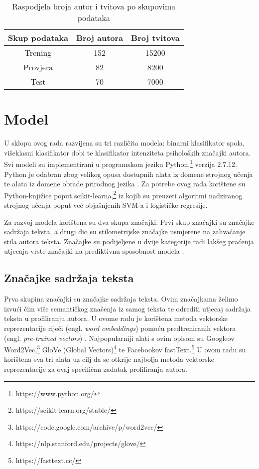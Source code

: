 \documentclass[times, utf8, zavrsni]{fer}
\begin{document}
\begin{table}[h!]
	\centering
	\begin{tabular}{||c |c | c||} 
		\hline
		Skup podataka & Broj autora & Broj tvitova \\ [0.5ex] 
		\hline\hline
		Trening & 152 & 15200 \\ 
		Provjera & 82 & 8200 \\
		Test &  70 & 7000  \\
		\hline
	\end{tabular}
	\caption{Raspodjela broja autor i tvitova po skupovima podataka}
	\label{Table:1}
\end{table}



\section{Model}

U sklopu ovog rada razvijena su tri različita modela: binarni klasifikator spola, višeklasni klasifikator dobi te klasifikator intenziteta psiholoških značajki autora. Svi modeli su implementirani u programskom jeziku Python,\footnote{https://www.python.org/} verzija 2.7.12. Python je odabran zbog velikog opusa dostupnih alata iz domene strojnog učenja te alata iz domene obrade prirodnog jezika \citep{python}. Za potrebe ovog rada korištene su Python-knjižice poput scikit-learna,\footnote{https://scikit-learn.org/stable/} iz kojih su preuzeti algoritmi nadziranog strojnog učenja poput već objašnjenih SVM-a i logističke regresije.

Za razvoj modela korištena su dva skupa značajki. Prvi skup značajki su značajke sadržaja teksta, a drugi dio su stilometrijske značajke usmjerene na zahvaćanje stila autora teksta. Značajke su podijeljene u dvije kategorije radi lakšeg praćenja utjecaja vrste značajki na prediktivnu sposobnost modela \citep{rangel2013}.




\subsection*{Značajke sadržaja teksta} 

Prva skupina značajki su značajke sadržaja teksta. Ovim značajkama želimo izvući čim više semantičkog značenja iz samog teksta te odrediti utjecaj sadržaja teksta u profiliranju autora. U ovome radu je korištena metoda vektorske reprezentacije riječi (engl. \textit{word embeddings}) pomoću predtreniranih vektora (engl. \textit{pre-trained vectors}) \citep{notebook2017}. Najpopularniji alati s ovim opisom su Googleov Word2Vec,\footnote{https://code.google.com/archive/p/word2vec/} GloVe (Global Vectors)\footnote{https://nlp.stanford.edu/projects/glove/} te Facebookov fastText.\footnote{https://fasttext.cc/} U ovom radu su korištena sva tri alata uz cilj da se otkrije najbolja metoda vektorske reprezentacije za ovaj specifičan zadatak profiliranja autora.
\end{document}

